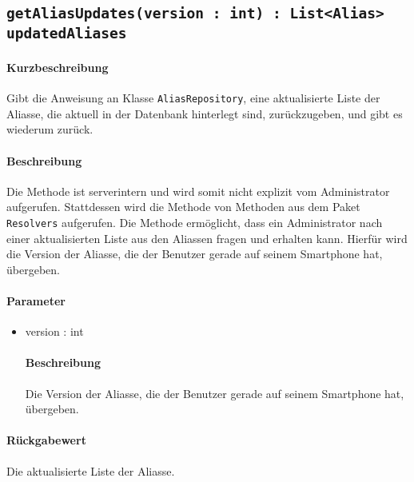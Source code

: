 \subsection{\texttt{getAliasUpdates(version : int) : List<Alias> updatedAliases}}%
\paragraph*{Kurzbeschreibung}
Gibt die Anweisung an Klasse \texttt{AliasRepository}, eine aktualisierte Liste der Aliasse, die aktuell in der Datenbank hinterlegt sind, zurückzugeben, und gibt es wiederum zurück.
\paragraph*{Beschreibung}
Die Methode ist serverintern und wird somit nicht explizit vom Administrator aufgerufen.
Stattdessen wird die Methode von Methoden aus dem Paket \texttt{Resolvers} aufgerufen.
Die Methode ermöglicht, dass ein Administrator nach einer aktualisierten Liste aus den Aliassen fragen und erhalten kann.
Hierfür wird die Version der Aliasse, die der Benutzer gerade auf seinem Smartphone hat, übergeben.
\paragraph*{Parameter}
\begin{itemize}
    \item version : int
    		\paragraph*{Beschreibung}
    		Die Version der Aliasse, die der Benutzer gerade auf seinem Smartphone hat, übergeben.
\end{itemize}
\paragraph*{Rückgabewert}
Die aktualisierte Liste der Aliasse.

